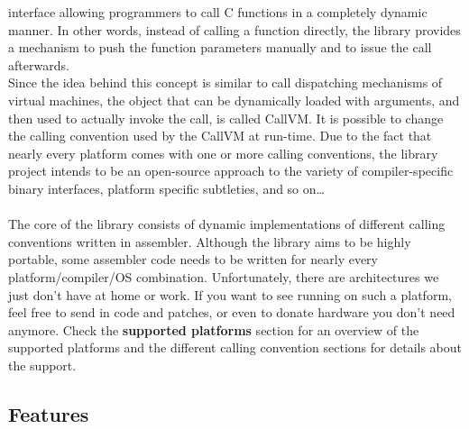 interface allowing programmers to call C functions 
in a completely dynamic manner. In other words, instead of calling a function 
directly, the  library provides a mechanism to push the function parameters 
manually and to issue the call afterwards.\\
Since the idea behind this concept is similar to call dispatching mechanisms
of virtual machines, the object that can be dynamically loaded with arguments,
and then used to actually invoke the call, is called CallVM. It is possible to
change the calling convention used by the CallVM at run-time.
Due to the fact that nearly every platform comes with one or more calling
conventions, the  library project intends to be an open-source approach
to the variety of compiler-specific binary interfaces, platform specific
subtleties, and so on\ldots\\
\\
The core of the library consists of dynamic implementations of different 
calling conventions written in assembler.
Although the library aims to be highly portable, some assembler code needs to 
be written for nearly every platform/compiler/OS combination.
Unfortunately, there are architectures we just don't have at home or work. If 
you want to see  running on such a platform, feel free to send
in code and patches, or even to donate hardware you don't need anymore.
Check the {\bf supported platforms} section for an overview of the supported 
platforms and the different calling convention sections for details about the 
support.
\\
\begin{comment}
@@@
A typical binary library consists of symbolic names that map to variables and
functions, the latter being pre-compiled for a
specific calling convention and architecture. Given \product{dyncall} has been ported to
that binary platform, it is possible to call such a function dynamically 
without writing glue code or prototypes or even knowing its C declaration - 
all that is needed is a pointer to it.\\
To avoid confusion, note that from the point of view of the library all 
parameters are handled the same way, even though the implementation might use
other ways to pass parameters in order to suit specific calling conventions.\\
\end{comment}


\subsection{Features}


